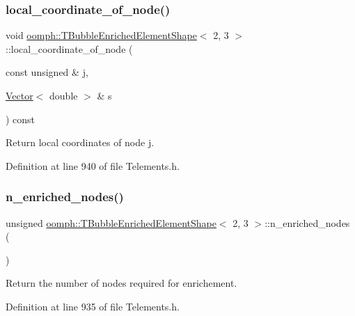 \subsubsection{\texorpdfstring{local\+\_\+coordinate\+\_\+of\+\_\+node()}{local\_coordinate\_of\_node()}}
{\footnotesize\ttfamily void \hyperlink{classoomph_1_1TBubbleEnrichedElementShape}{oomph\+::\+T\+Bubble\+Enriched\+Element\+Shape}$<$ 2, 3 $>$\+::local\+\_\+coordinate\+\_\+of\+\_\+node (\begin{DoxyParamCaption}\item[{const unsigned \&}]{j,  }\item[{\hyperlink{classoomph_1_1Vector}{Vector}$<$ double $>$ \&}]{s }\end{DoxyParamCaption}) const\hspace{0.3cm}{\ttfamily [inline]}}



Return local coordinates of node j. 



Definition at line 940 of file Telements.\+h.

\mbox{\label{classoomph_1_1TBubbleEnrichedElementShape_3_012_00_013_01_4_a2d1fccdb7170138d34ffd78424fd6808}} 
\subsubsection{\texorpdfstring{n\+\_\+enriched\+\_\+nodes()}{n\_enriched\_nodes()}}
{\footnotesize\ttfamily unsigned \hyperlink{classoomph_1_1TBubbleEnrichedElementShape}{oomph\+::\+T\+Bubble\+Enriched\+Element\+Shape}$<$ 2, 3 $>$\+::n\+\_\+enriched\+\_\+nodes (\begin{DoxyParamCaption}{ }\end{DoxyParamCaption})\hspace{0.3cm}{\ttfamily [inline]}}



Return the number of nodes required for enrichement. 



Definition at line 935 of file Telements.\+h.

